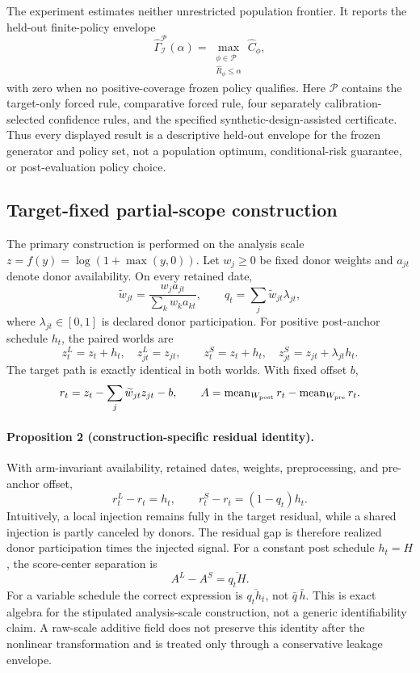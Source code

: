 The experiment estimates neither unrestricted population frontier. It reports
the held-out finite-policy envelope
\[
  \widehat\Gamma_{\mathcal I}^{\mathcal P}(\alpha)
  =\max_{\substack{\phi\in\mathcal P\\ \widehat R_\phi\le\alpha}}
       \widehat C_\phi,
\]
with zero when no positive-coverage frozen policy qualifies. Here $\mathcal
P$ contains the target-only forced rule, comparative forced rule, four
separately calibration-selected confidence rules, and the specified
synthetic-design-assisted certificate. Thus every displayed result is a
descriptive held-out envelope for the frozen generator and policy set, not a
population optimum, conditional-risk guarantee, or post-evaluation policy
choice.

\subsection{Target-fixed partial-scope construction}

The primary construction is performed on the analysis scale
$z=f(y)=\log(1+\max(y,0))$. Let $w_j\geq0$ be fixed donor weights and
$a_{jt}$ denote donor availability. On every retained date,
\[
  \widetilde w_{jt}
  =\frac{w_ja_{jt}}{\sum_k w_ka_{kt}},\qquad
  q_t=\sum_j\widetilde w_{jt}\lambda_{jt},
\]
where $\lambda_{jt}\in[0,1]$ is declared donor participation. For positive
post-anchor schedule $h_t$, the paired worlds are
\[
  z^L_t=z_t+h_t,\quad z^L_{jt}=z_{jt},
  \qquad
  z^S_t=z_t+h_t,\quad z^S_{jt}=z_{jt}+\lambda_{jt}h_t.
\]
The target path is exactly identical in both worlds. With fixed offset $b$,
\[
  r_t=z_t-\sum_j\widetilde w_{jt}z_{jt}-b,
  \qquad
  A=\operatorname{mean}_{W_{\rm post}}r_t-
    \operatorname{mean}_{W_{\rm pre}}r_t .
\]

\paragraph{Proposition 2 (construction-specific residual identity).}
With arm-invariant availability, retained dates, weights, preprocessing, and
pre-anchor offset,
\[
  r^L_t-r_t=h_t,\qquad
  r^S_t-r_t=(1-q_t)h_t.
\]
Intuitively, a local injection remains fully in the target residual, while a
shared injection is partly canceled by donors. The residual gap is therefore
realized donor participation times the injected signal. For a constant post
schedule $h_t=H$, the score-center separation is
\[
  A^L-A^S=\overline{q_tH}.
\]
For a variable schedule the correct expression is $\overline{q_th_t}$, not
$\bar q\,\bar h$. This is exact algebra for the stipulated analysis-scale
construction, not a generic identifiability claim. A raw-scale additive field
does not preserve this identity after the nonlinear transformation and is
treated only through a conservative leakage envelope.

